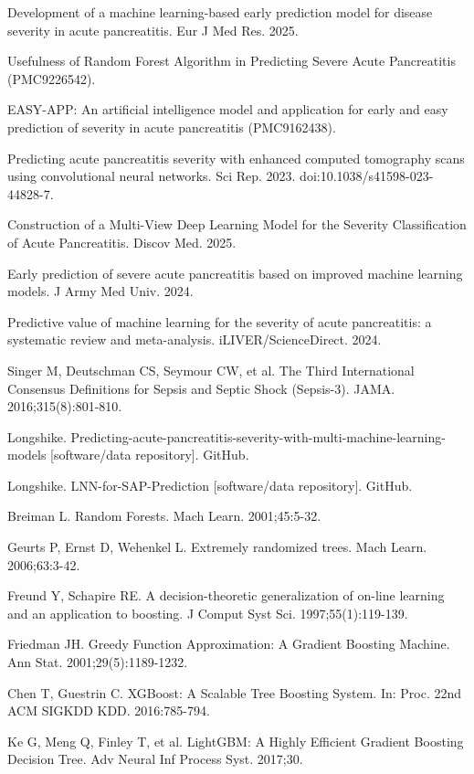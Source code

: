 \documentclass[10pt]{article} %
\begin{document}
\begin{small}
\noindent [13] Development of a machine learning-based early prediction model for disease severity in acute pancreatitis. Eur J Med Res. 2025.

\noindent [14] Usefulness of Random Forest Algorithm in Predicting Severe Acute Pancreatitis (PMC9226542).

\noindent [15] EASY-APP: An artificial intelligence model and application for early and easy prediction of severity in acute pancreatitis (PMC9162438).

\noindent [16] Predicting acute pancreatitis severity with enhanced computed tomography scans using convolutional neural networks. Sci Rep. 2023. doi:10.1038/s41598-023-44828-7.

\noindent [17] Construction of a Multi-View Deep Learning Model for the Severity Classification of Acute Pancreatitis. Discov Med. 2025.

\noindent [18] Early prediction of severe acute pancreatitis based on improved machine learning models. J Army Med Univ. 2024.

\noindent [19] Predictive value of machine learning for the severity of acute pancreatitis: a systematic review and meta-analysis. iLIVER/ScienceDirect. 2024.

\noindent [20] Singer M, Deutschman CS, Seymour CW, et al. The Third International Consensus Definitions for Sepsis and Septic Shock (Sepsis-3). JAMA. 2016;315(8):801-810.

\noindent [21] Longshike. Predicting-acute-pancreatitis-severity-with-multi-machine-learning-models [software/data repository]. GitHub.

\noindent [22] Longshike. LNN-for-SAP-Prediction [software/data repository]. GitHub.

\noindent [23] Breiman L. Random Forests. Mach Learn. 2001;45:5-32.

\noindent [24] Geurts P, Ernst D, Wehenkel L. Extremely randomized trees. Mach Learn. 2006;63:3-42.

\noindent [25] Freund Y, Schapire RE. A decision-theoretic generalization of on-line learning and an application to boosting. J Comput Syst Sci. 1997;55(1):119-139.

\noindent [26] Friedman JH. Greedy Function Approximation: A Gradient Boosting Machine. Ann Stat. 2001;29(5):1189-1232.

\noindent [27] Chen T, Guestrin C. XGBoost: A Scalable Tree Boosting System. In: Proc. 22nd ACM SIGKDD KDD. 2016:785-794.

\noindent [28] Ke G, Meng Q, Finley T, et al. LightGBM: A Highly Efficient Gradient Boosting Decision Tree. Adv Neural Inf Process Syst. 2017;30.


\end{small}
\end{document}
